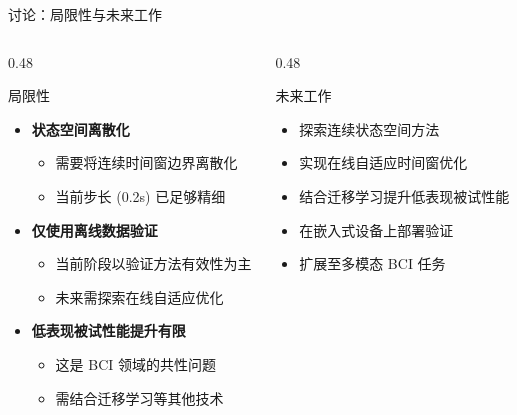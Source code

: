 \begin{frame}{讨论：局限性与未来工作}
    \begin{columns}[T]
        \begin{column}{0.48\textwidth}
            \begin{alertblock}{\normalsize 局限性}
                \begin{itemize}
                    \item \textbf{状态空间离散化}
                    \begin{itemize}
                        \item 需要将连续时间窗边界离散化
                        \item 当前步长 (0.2s) 已足够精细
                    \end{itemize}

                    \vspace{0.5em}
                    \item \textbf{仅使用离线数据验证}
                    \begin{itemize}
                        \item 当前阶段以验证方法有效性为主
                        \item 未来需探索在线自适应优化
                    \end{itemize}

                    \vspace{0.5em}
                    \item \textbf{低表现被试性能提升有限}
                    \begin{itemize}
                        \item 这是 BCI 领域的共性问题
                        \item 需结合迁移学习等其他技术
                    \end{itemize}
                \end{itemize}
            \end{alertblock}
        \end{column}

        \begin{column}{0.48\textwidth}
            \begin{exampleblock}{\normalsize 未来工作}
                \begin{itemize}
                    \item 探索连续状态空间方法
                    \item 实现在线自适应时间窗优化
                    \item 结合迁移学习提升低表现被试性能
                    \item 在嵌入式设备上部署验证
                    \item 扩展至多模态 BCI 任务
                \end{itemize}
            \end{exampleblock}
        \end{column}
    \end{columns}
\end{frame}


